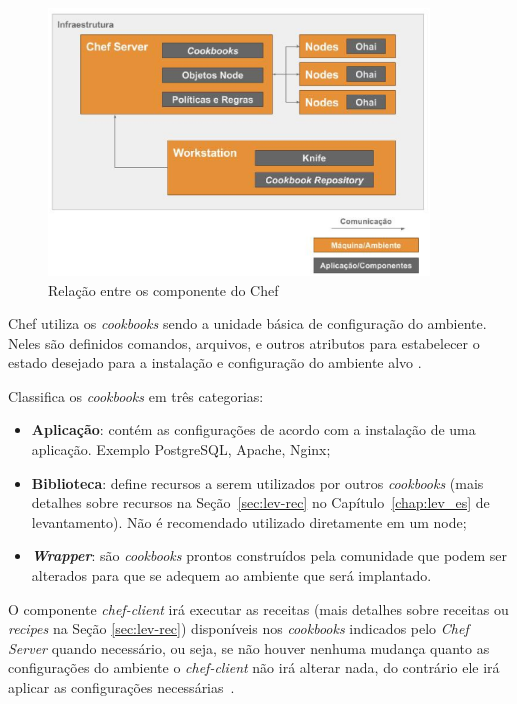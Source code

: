 \begin{figure}[H]
  \centering
  \caption{Relação entre os componente do Chef}
  \label{fig:chef-comp}
  \includegraphics[width=0.9\textwidth]{figuras/chef-comp.eps}
\end{figure}

Chef utiliza os \textit{cookbooks} sendo a unidade básica de configuração do
ambiente. Neles são definidos comandos, arquivos, e outros atributos
para estabelecer o estado desejado para a instalação e configuração
do ambiente alvo \cite{sharma:2015}.

 Classifica os \textit{cookbooks} em três categorias:
\begin{itemize}
  \item \textbf{Aplicação}: contém as configurações de acordo com a instalação de
    uma aplicação. Exemplo PostgreSQL, Apache, Nginx;
  \item \textbf{Biblioteca}: define recursos a serem utilizados por outros \textit{cookbooks}
    (mais detalhes sobre recursos na Seção~\ref{sec:lev-rec} no Capítulo~\ref{chap:lev_es} de levantamento).
    Não é recomendado utilizado diretamente em um node;
  \item \textbf{\textit{Wrapper}}: são \textit{cookbooks} prontos construídos pela comunidade que podem
    ser alterados para que se adequem ao ambiente que será implantado.
\end{itemize}

O componente \textit{chef-client} irá executar as receitas (mais detalhes sobre receitas ou
\textit{recipes} na Seção \ref{sec:lev-rec}) disponíveis nos \textit{cookbooks}
indicados pelo \textit{Chef Server} quando necessário, ou seja, se não houver
nenhuma mudança quanto as configurações do ambiente o \textit{chef-client} não irá
alterar nada, do contrário ele irá aplicar as configurações necessárias~\cite{chefdoc:2016}.




